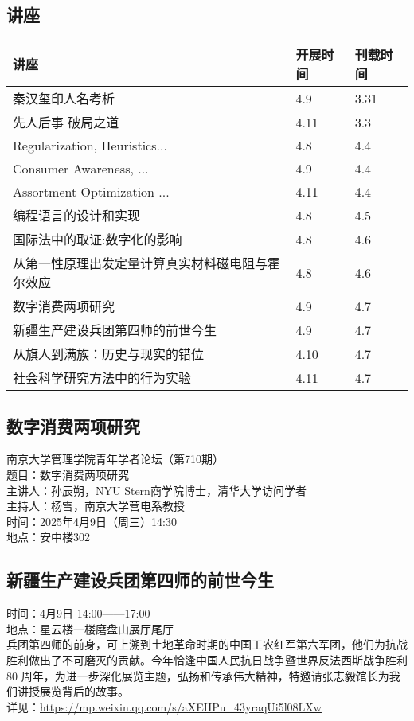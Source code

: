 \documentclass[letterpaper, 12pt]{article}
\begin{document}
\begin{multicols}{2}
\pagebreak

\section{讲座}
\begin{tabular}{|>{\centering\arraybackslash}m{}|m{}|m{}|}
    \hline
    讲座 & 开展时间 & 刊载时间\\
    \hline\hline
    秦汉玺印人名考析 & 4.9 & 3.31\\\hline
    先人后事 破局之道 & 4.11 & 3.3\\\hline
    Regularization, Heuristics... & 4.8 & 4.4\\\hline
    Consumer Awareness, ... & 4.9 & 4.4\\\hline
    Assortment Optimization ... & 4.11 & 4.4\\\hline
    编程语言的设计和实现 & 4.8 & 4.5\\\hline
    国际法中的取证:数字化的影响 & 4.8 & 4.6\\\hline
    从第一性原理出发定量计算真实材料磁电阻与霍尔效应 & 4.8 & 4.6\\\hline
    数字消费两项研究 & 4.9 & 4.7\\\hline
    新疆生产建设兵团第四师的前世今生 & 4.9 & 4.7\\\hline
    从旗人到满族：历史与现实的错位 & 4.10 & 4.7\\\hline
    社会科学研究方法中的行为实验 & 4.11 & 4.7\\\hline
\end{tabular}
\subsection{数字消费两项研究}
南京大学管理学院青年学者论坛（第710期）
\\题目：数字消费两项研究
\\主讲人：孙辰朔，NYU Stern商学院博士，清华大学访问学者
\\主持人：杨雪，南京大学营电系教授
\\时间：2025年4月9日（周三）14:30
\\地点：安中楼302

\subsection{新疆生产建设兵团第四师的前世今生}
时间：4月9日 14:00——17:00
\\地点：星云楼一楼磨盘山展厅尾厅
\\兵团第四师的前身，可上溯到土地革命时期的中国工农红军第六军团，他们为抗战胜利做出了不可磨灭的贡献。今年恰逢中国人民抗日战争暨世界反法西斯战争胜利 80 周年，为进一步深化展览主题，弘扬和传承伟大精神，特邀请张志毅馆长为我们讲授展览背后的故事。
\\详见：\url{https://mp.weixin.qq.com/s/aXEHPu_43yraqUi5l08LXw}


\end{multicols}
\end{document}
